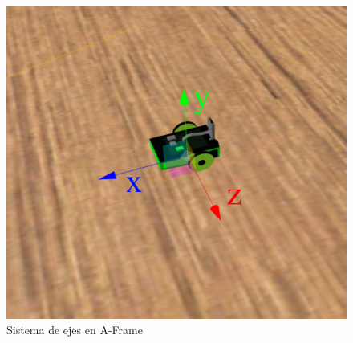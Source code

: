 \begin{figure}[H]
    \centering
    \includegraphics[scale=0.3]{img/ejesframe.jpg}
    \caption{Sistema de ejes en A-Frame} \label{fig:ejesFrame}
\end{figure}

